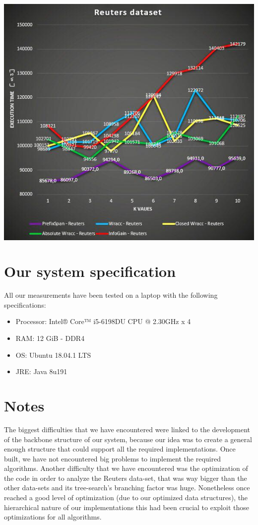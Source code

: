 \documentclass[10pt, a4paper]{article}
\begin{document}
	\begin{center}
	\includegraphics[scale =0.45]{reuters.jpg}
	\end{center}

	\section{Our system specification}
		All our measurements have been tested on a laptop with the following specifications:
		\begin{multicols}{2}
			\begin{itemize}
				\item Processor: Intel® Core™ i5-6198DU CPU @ 2.30GHz x 4 
				\item RAM: 12 GiB - DDR4
				\item OS: Ubuntu 18.04.1 LTS
				\item JRE: Java 8u191
			\end{itemize}
		\end{multicols}
	
	\section{Notes}
	The biggest difficulties that we have encountered were linked to the development of the backbone structure of our system, because our idea was to create a general enough structure that could support all the required implementations. Once built, we have not encountered big problems to implement the required algorithms. Another difficulty that we have encountered was the optimization of the code in order to analyze the Reuters data-set, that was way bigger than the other data-sets and its tree-search's branching factor was huge. Nonetheless once reached a good level of optimization (due to our optimized data structures), the hierarchical nature of our implementations  this had been crucial to exploit those optimizations for all algorithms.
		
\end{document}

